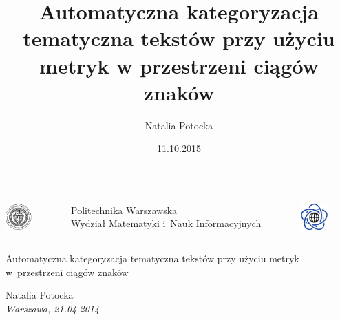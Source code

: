 \documentclass[11pt,pdftex,mathserif]{beamer}\usepackage[]{graphicx}\usepackage[]{color}
\title[Kategoryzacja tematyczna tekstów ]{Automatyczna kategoryzacja tematyczna tekstów przy użyciu metryk w przestrzeni ciągów znaków}
\author[N. Potocka]{Natalia Potocka}
\date[11.10.2015]{11.10.2015}
\theoremstyle{definition}
\begin{document}
\thispagestyle{empty}%
\begin{frame}%

   \begin{center}%
%
%
%
      \begin{columns}%
         \begin{column}[c]{1.2cm}\centering%
         \includegraphics[height=1.0cm]{logopw.pdf} \\%
         \end{column}

         \begin{column}[c]{7cm}\centering
            {\footnotesize{Politechnika Warszawska}}\\%
            {\footnotesize{Wydział Matematyki i~Nauk Informacyjnych}}%
         \end{column}

         \begin{column}[c]{1.2cm}\centering%
         \includegraphics[height=1.0cm]{logomini.pdf} \\%
         \end{column}%
      \end{columns}


      \vspace*{2em}

      \colorbox{green2}{\parbox{10cm}{\color{black}\centering\LARGE{Automatyczna kategoryzacja tematyczna tekstów przy użyciu metryk w~przestrzeni ciągów znaków}}}

      \vspace*{1.5em}%
      {\Large{Natalia Potocka}}\\%

      {\it\footnotesize Warszawa, 21.04.2014}  %

   \end{center}

\end{frame}
\end{document}
